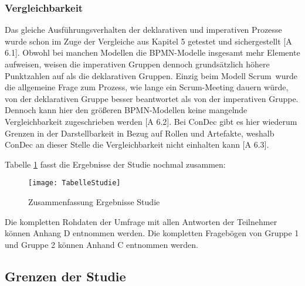 \subsubsection{Vergleichbarkeit}
Das gleiche Ausführungsverhalten der deklarativen und imperativen Prozesse wurde schon im Zuge der Vergleiche aus Kapitel 5 getestet und sichergestellt [A 6.1]. \newline
Obwohl bei manchen Modellen die BPMN-Modelle insgesamt mehr Elemente aufweisen, weisen die imperativen Gruppen dennoch grundsätzlich höhere Punktzahlen auf als die deklarativen Gruppen. Einzig beim Modell \grqq Scrum\grqq \ wurde die allgemeine Frage zum Prozess, wie lange ein Scrum-Meeting dauern würde, von der deklarativen Gruppe besser beantwortet als von der imperativen Gruppe. Dennoch kann hier den größeren BPMN-Modellen keine mangelnde Vergleichbarkeit zugeschrieben werden [A 6.2].\newline
Bei ConDec gibt es hier wiederum Grenzen in der Darstellbarkeit in Bezug auf Rollen und Artefakte, weshalb ConDec an dieser Stelle die Vergleichbarkeit nicht einhalten kann [A 6.3].\newline


Tabelle \ref{fig:TabelleStudie} fasst die Ergebnisse der Studie nochmal zusammen:

\begin{figure}[htp]
\begin{center}
  \texttt{[image: TabelleStudie]} %
  \caption{Zusammenfassung Ergebnisse Studie}
  \label{fig:TabelleStudie}
\end{center}
\end{figure}

Die kompletten Rohdaten der Umfrage mit allen Antworten der Teilnehmer können Anhang D entnommen werden. Die kompletten Fragebögen von Gruppe 1 und Gruppe 2 können Anhand C entnommen werden.\newline

\subsection{Grenzen der Studie}

